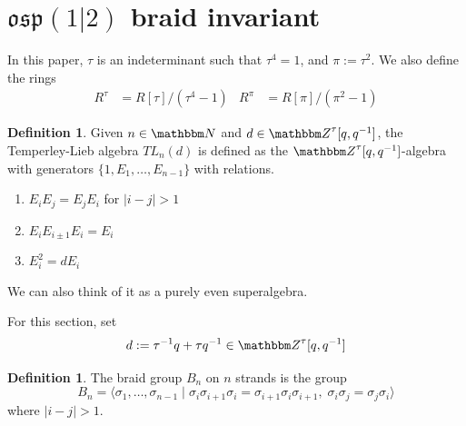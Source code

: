 \documentclass{amsart}
\newcommand{\hackcenter}[1]{
 \xy (0,0)*{#1}; \endxy}
\theoremstyle{plain}
\theoremstyle{definition}
\newtheorem{definition}[theorem]{Definition}
\theoremstyle{definition}
\numberwithin{equation}{section}
\numberwithin{theorem}{section}
\def\mf{\mathfrak}
\numberwithin{equation}{section}
\def\N{{\mathbbm N}}
\def\Z{{\mathbbm Z}}
\begin{document}
\section{$\mf{osp}(1|2)$ braid invariant}
In this paper, $\tau$ is an indeterminant such that $\tau^4=1$, and $\pi:=\tau^2$. We also define the rings
\begin{align*}
  R^\tau &=R[\tau]/(\tau^4-1) &  R^\pi &=R[\pi]/(\pi^2-1)
\end{align*}

\begin{definition}
  Given $n\in \N$ and $d\in \Z^\tau[q,q^{-1}]$, the Temperley-Lieb algebra $TL_n(d)$ is defined as the $\Z^\tau[q,q^{-1}]$-algebra with generators $\{1,E_1, \dots, E_{n-1}\}$ with relations.
  \begin{enumerate}
    \item $E_iE_j=E_jE_i$ for $|i-j|>1$
    \item $E_{i}E_{i\pm 1}E_i=E_i$
    \item $E_i^2=dE_i$
  \end{enumerate}
  We can also think of it as a purely even superalgebra.
\end{definition}


For this section, set
\[
d:=\tau^{-1}q+ \tau q^{-1}\in \Z^{\tau}[q,q^{-1}]
\]

\begin{definition}
  The braid group $B_n$ on $n$ strands is the group
  \[B_n= \langle \sigma_1, \dots, \sigma_{n-1} \mid \sigma_{i}\sigma_{i+1}\sigma_{i}=\sigma_{i+1}\sigma_{i}\sigma_{i+1}, \; \sigma_i\sigma_j = \sigma_j \sigma_i \rangle\]
  where $|i-j|>1$.
\end{definition}

\end{document}
